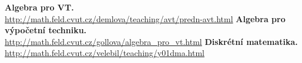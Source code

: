 \documentclass{article}
\begin{document}
\begin{thebibliography}{9}
               {\bf Algebra pro VT.} \\ 
	       \url{http://math.feld.cvut.cz/demlova/teaching/avt/predn-avt.html}
               {\bf Algebra pro výpočetní techniku.} \\ 
	       \url{http://math.feld.cvut.cz/gollova/algebra_pro_vt.html}
               {\bf Diskrétní matematika.} \\ 
	       \url{http://math.feld.cvut.cz/velebil/teaching/y01dma.html}
             
\end{thebibliography}
\end{document}
